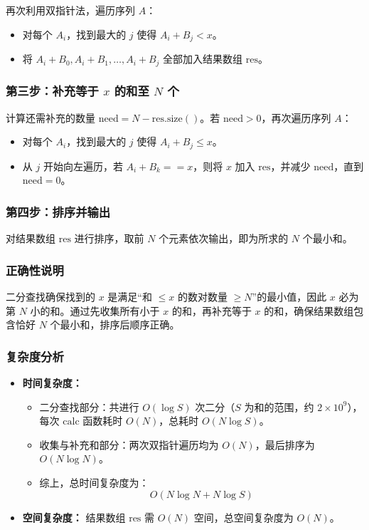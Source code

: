 \documentclass[11pt,a4paper,twocolumn]{ctexart}  %
\begin{document}
再次利用双指针法，遍历序列 $A$：
\begin{itemize}
    \item 对每个 $A_i$，找到最大的 $j$ 使得 $A_i + B_j < x$。
    \item 将 $A_i + B_0, A_i + B_1, \dots, A_i + B_j$ 全部加入结果数组 $\mathrm{res}$。
\end{itemize}

\subsubsection*{第三步：补充等于 $x$ 的和至 $N$ 个}

计算还需补充的数量 $\mathrm{need} = N - \mathrm{res.size()}$。若 $\mathrm{need} > 0$，再次遍历序列 $A$：
\begin{itemize}
    \item 对每个 $A_i$，找到最大的 $j$ 使得 $A_i + B_j \leq x$。
    \item 从 $j$ 开始向左遍历，若 $A_i + B_k == x$，则将 $x$ 加入 $\mathrm{res}$，并减少 $\mathrm{need}$，直到 $\mathrm{need} = 0$。
\end{itemize}

\subsubsection*{第四步：排序并输出}

对结果数组 $\mathrm{res}$ 进行排序，取前 $N$ 个元素依次输出，即为所求的 $N$ 个最小和。

\subsubsection*{正确性说明}

二分查找确保找到的 $x$ 是满足“和 $\leq x$ 的数对数量 $\geq N$”的最小值，因此 $x$ 必为第 $N$ 小的和。通过先收集所有小于 $x$ 的和，再补充等于 $x$ 的和，确保结果数组包含恰好 $N$ 个最小和，排序后顺序正确。

\subsubsection*{复杂度分析}

\begin{itemize}
    \item \textbf{时间复杂度：}
    \begin{itemize}
        \item 二分查找部分：共进行 $O(\log S)$ 次二分（$S$ 为和的范围，约 $2 \times 10^9$），每次 $\mathrm{calc}$ 函数耗时 $O(N)$，总耗时 $O(N \log S)$。
        \item 收集与补充和部分：两次双指针遍历均为 $O(N)$，最后排序为 $O(N \log N)$。
        \item 综上，总时间复杂度为：
        \[
            O(N \log N + N \log S)
        \]
    \end{itemize}
    \item \textbf{空间复杂度：} 结果数组 $\mathrm{res}$ 需 $O(N)$ 空间，总空间复杂度为 $O(N)$。
\end{itemize}
\end{document}
